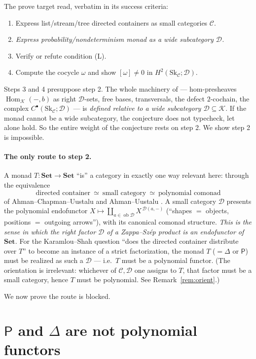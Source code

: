 \documentclass[11pt]{article}
\theoremstyle{definition}
\newcommand{\Hom}{\operatorname{Hom}}
\newcommand{\C}{\mathcal{C}}
\newcommand{\D}{\mathcal{D}}
\newcommand{\K}{\mathcal{K}}
\newcommand{\Set}{\mathbf{Set}}
\newcommand{\Sk}{\mathrm{Sk}}
\newcommand{\ob}{\operatorname{ob}}
\newcommand{\Pow}{\mathsf{P}}
\newcommand{\Dist}{\Delta}
\begin{document}
The prove target read, verbatim in its success criteria:
\begin{enumerate}
\item Express list/stream/tree directed containers as small categories $\C$.
\item \emph{Express probability/nondeterminism monad as a wide subcategory $\D$.}
\item Verify or refute condition \textnormal{(L)}.
\item Compute the cocycle $\omega$ and show $[\omega]\neq0$ in $H^2(\Sk_\C;\D)$.
\end{enumerate}
Steps 3 and 4 presuppose step 2. The whole machinery of \cite{Gcohom,pairwise} ---
hom-presheaves $\Hom_\K(-,b)$ as right $\D$-sets, free bases, transversals, the
defect $2$-cochain, the complex $C^\bullet(\Sk_\C;\D)$ --- is \emph{defined relative
to a wide subcategory $\D\subseteq\K$}. If the monad cannot be a wide subcategory,
the conjecture does not typecheck, let alone hold. So the entire weight of the
conjecture rests on step 2. We show step 2 is impossible.

\paragraph{The only route to step 2.} A monad $T\colon\Set\to\Set$ ``is'' a category
in exactly one way relevant here: through the equivalence
\[
   \text{directed container}\ \simeq\ \text{small category}\ \simeq\
   \text{polynomial comonad}
\]
of Ahman--Chapman--Uustalu and Ahman--Uustalu \cite{acu,auCats}. A small category
$\D$ presents the polynomial endofunctor $X\mapsto\coprod_{a\in\ob\D}X^{\,\D(a,-)}$
(``shapes $=$ objects, positions $=$ outgoing arrows''), with its canonical comonad
structure. \emph{This is the sense in which the right factor $\D$ of a Zappa--Sz\'ep
product is an endofunctor of $\Set$.} For the Karamlou--Shah question ``does the
directed container distribute over $T$'' to become an instance of a strict
factorization, the monad $T$ ($=\Dist$ or $\Pow$) must be realized as such a
$\D$ --- i.e.\ $T$ must be a polynomial functor. (The orientation is irrelevant:
whichever of $\C,\D$ one assigns to $T$, that factor must be a small category, hence
$T$ must be polynomial. See Remark~\ref{rem:orient}.)

We now prove the route is blocked.

\section{$\Pow$ and $\Dist$ are not polynomial functors}
\end{document}
